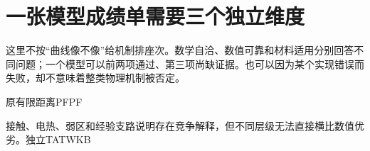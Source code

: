 \section{{\cjkfont 一张模型成绩单需要三个独立维度}\allowbreak{}}\label{sec:55}
{\cjkfont 这里不按“曲线像不像”给机制排座次。数学自洽、数值可靠和材料适用分别回答不同问题；一个模型可以前两项通过、第三项尚缺证据。也可以因为某个实现错误而失败，却不意味着整类物理机制被否定。}\allowbreak{}
\par
{\cjkfont 原有限距离}\allowbreak{}PF\allowbreak{}PF\allowbreak{}
\par
{\cjkfont 接触、电热、弱区和经验支路说明存在竞争解释，但不同层级无法直接横比数值优劣。独立}\allowbreak{}TAT\allowbreak{}WKB\allowbreak{}
\par
